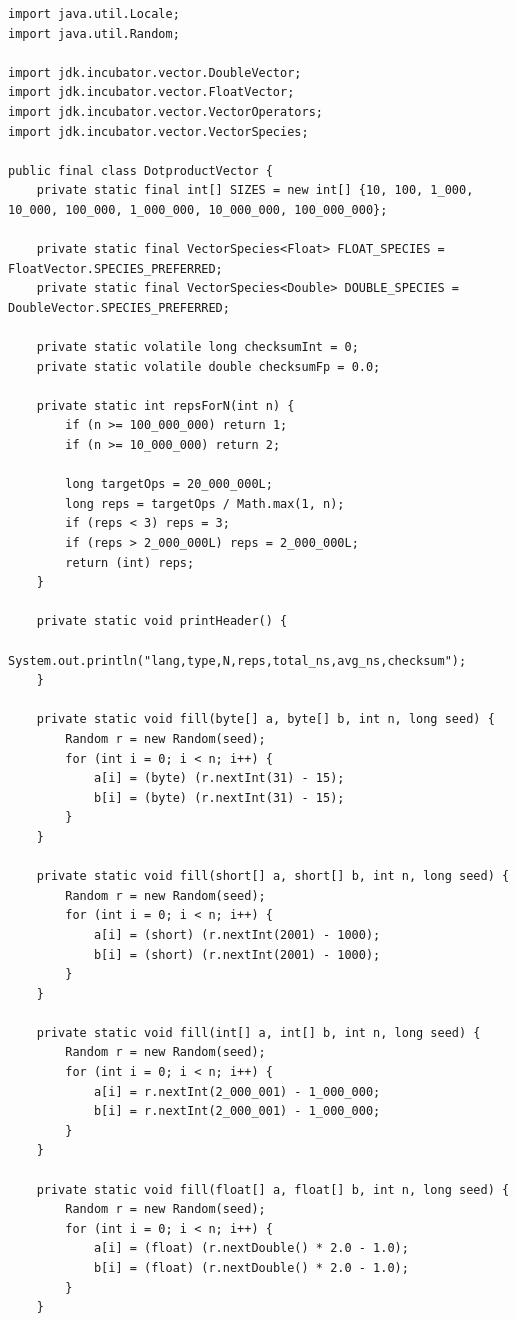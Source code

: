 \documentclass[12pt,fontset=none]{ctexart}
\begin{document}
\begin{verbatim}
import java.util.Locale;
import java.util.Random;

import jdk.incubator.vector.DoubleVector;
import jdk.incubator.vector.FloatVector;
import jdk.incubator.vector.VectorOperators;
import jdk.incubator.vector.VectorSpecies;

public final class DotproductVector {
    private static final int[] SIZES = new int[] {10, 100, 1_000, 10_000, 100_000, 1_000_000, 10_000_000, 100_000_000};

    private static final VectorSpecies<Float> FLOAT_SPECIES = FloatVector.SPECIES_PREFERRED;
    private static final VectorSpecies<Double> DOUBLE_SPECIES = DoubleVector.SPECIES_PREFERRED;

    private static volatile long checksumInt = 0;
    private static volatile double checksumFp = 0.0;

    private static int repsForN(int n) {
        if (n >= 100_000_000) return 1;
        if (n >= 10_000_000) return 2;

        long targetOps = 20_000_000L;
        long reps = targetOps / Math.max(1, n);
        if (reps < 3) reps = 3;
        if (reps > 2_000_000L) reps = 2_000_000L;
        return (int) reps;
    }

    private static void printHeader() {
        System.out.println("lang,type,N,reps,total_ns,avg_ns,checksum");
    }

    private static void fill(byte[] a, byte[] b, int n, long seed) {
        Random r = new Random(seed);
        for (int i = 0; i < n; i++) {
            a[i] = (byte) (r.nextInt(31) - 15);
            b[i] = (byte) (r.nextInt(31) - 15);
        }
    }

    private static void fill(short[] a, short[] b, int n, long seed) {
        Random r = new Random(seed);
        for (int i = 0; i < n; i++) {
            a[i] = (short) (r.nextInt(2001) - 1000);
            b[i] = (short) (r.nextInt(2001) - 1000);
        }
    }

    private static void fill(int[] a, int[] b, int n, long seed) {
        Random r = new Random(seed);
        for (int i = 0; i < n; i++) {
            a[i] = r.nextInt(2_000_001) - 1_000_000;
            b[i] = r.nextInt(2_000_001) - 1_000_000;
        }
    }

    private static void fill(float[] a, float[] b, int n, long seed) {
        Random r = new Random(seed);
        for (int i = 0; i < n; i++) {
            a[i] = (float) (r.nextDouble() * 2.0 - 1.0);
            b[i] = (float) (r.nextDouble() * 2.0 - 1.0);
        }
    }


\end{verbatim}
\end{document}
